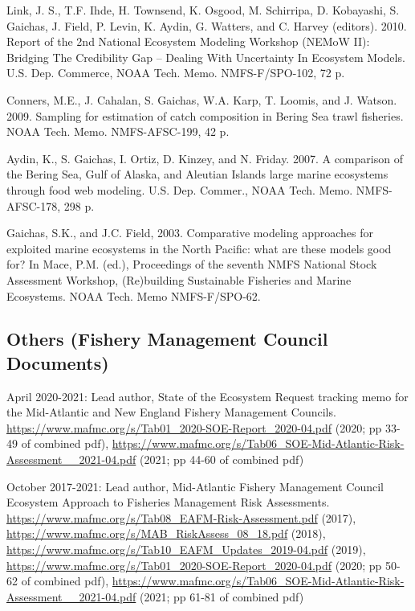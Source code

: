 \documentclass[11pt, a4paper]{awesome-cv}
\begin{document}
Link, J. S., T.F. Ihde, H. Townsend, K. Osgood, M. Schirripa, D.
Kobayashi, S. Gaichas, J. Field, P. Levin, K. Aydin, G. Watters, and C.
Harvey (editors). 2010. Report of the 2nd National Ecosystem Modeling
Workshop (NEMoW II): Bridging The Credibility Gap -- Dealing With
Uncertainty In Ecosystem Models. U.S. Dep. Commerce, NOAA Tech. Memo.
NMFS-F/SPO-102, 72 p.

Conners, M.E., J. Cahalan, S. Gaichas, W.A. Karp, T. Loomis, and J.
Watson. 2009. Sampling for estimation of catch composition in Bering Sea
trawl fisheries. NOAA Tech. Memo. NMFS-AFSC-199, 42 p.~

Aydin, K., S. Gaichas, I. Ortiz, D. Kinzey, and N. Friday. 2007. A
comparison of the Bering Sea, Gulf of Alaska, and Aleutian Islands large
marine ecosystems through food web modeling. U.S. Dep. Commer., NOAA
Tech. Memo. NMFS-AFSC-178, 298 p.

Gaichas, S.K., and J.C. Field, 2003. Comparative modeling approaches for
exploited marine ecosystems in the North Pacific: what are these models
good for? In Mace, P.M. (ed.), Proceedings of the seventh NMFS National
Stock Assessment Workshop, (Re)building Sustainable Fisheries and Marine
Ecosystems. NOAA Tech. Memo NMFS-F/SPO-62.

\hypertarget{others-fishery-management-council-documents}{%
\subsection{Others (Fishery Management Council
Documents)}\label{others-fishery-management-council-documents}}

April 2020-2021: Lead author, State of the Ecosystem Request tracking
memo for the Mid-Atlantic and New England Fishery Management Councils.
\url{https://www.mafmc.org/s/Tab01_2020-SOE-Report_2020-04.pdf} (2020;
pp 33-49 of combined pdf),
\url{https://www.mafmc.org/s/Tab06_SOE-Mid-Atlantic-Risk-Assessment__2021-04.pdf}
(2021; pp 44-60 of combined pdf)

October 2017-2021: Lead author, Mid-Atlantic Fishery Management Council
Ecosystem Approach to Fisheries Management Risk Assessments.
\url{https://www.mafmc.org/s/Tab08_EAFM-Risk-Assessment.pdf} (2017),
\url{https://www.mafmc.org/s/MAB_RiskAssess_08_18.pdf} (2018),
\url{https://www.mafmc.org/s/Tab10_EAFM_Updates_2019-04.pdf} (2019),
\url{https://www.mafmc.org/s/Tab01_2020-SOE-Report_2020-04.pdf} (2020;
pp 50-62 of combined pdf),
\url{https://www.mafmc.org/s/Tab06_SOE-Mid-Atlantic-Risk-Assessment__2021-04.pdf}
(2021; pp 61-81 of combined pdf)
\end{document}

